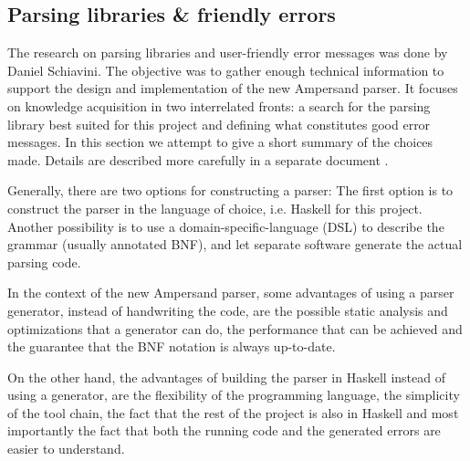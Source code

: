 

\subsection{Parsing libraries \& friendly errors}
\label{domain:parsing}
The research on parsing libraries and user-friendly error messages was done by Daniel Schiavini.
The objective was to gather enough technical information to support the design and implementation of the new Ampersand parser.
It focuses on knowledge acquisition in two interrelated fronts: a search for the parsing library best suited for this project and defining what constitutes good error messages.
In this section we attempt to give a short summary of the choices made.
Details are described more carefully in a separate document .


%
Generally, there are two options for constructing a parser:
The first option is to construct the parser in the language of choice, i.e. Haskell for this project.
Another possibility is to use a domain-specific-language (DSL) to describe the grammar (usually annotated BNF), and let separate software generate the actual parsing code.

In the context of the new Ampersand parser, some advantages of using a parser generator, instead of handwriting the code, are the possible static analysis and optimizations that a generator can do, the performance that can be achieved and the guarantee that the BNF notation is always up-to-date.

On the other hand, the advantages of building the parser in Haskell instead of using a generator, are the flexibility of the programming language, the simplicity of the tool chain, the fact that the rest of the project is also in Haskell and most importantly the fact that both the running code and the generated errors are easier to understand.

